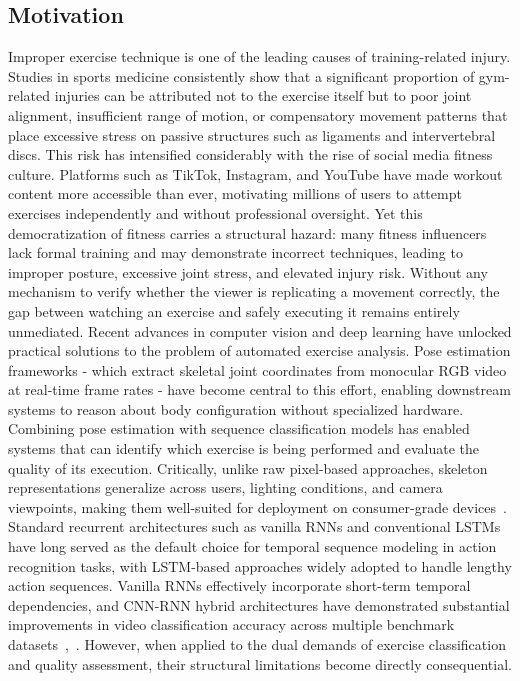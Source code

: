 \documentclass[conference,onecolumn,oneside]{IEEEtran}
\begin{document}
\subsection{Motivation}
\vspace{0.5cm}
Improper exercise technique is one of the leading causes of training-related injury. Studies in sports medicine consistently show that a significant proportion of gym-related injuries can be attributed not to the exercise itself but to poor joint alignment, insufficient range of motion, or compensatory movement patterns that place excessive stress on passive structures such as ligaments and intervertebral discs. This risk has intensified considerably with the rise of social media fitness culture. Platforms such as TikTok, Instagram, and YouTube have made workout content more accessible than ever, motivating millions of users to attempt exercises independently and without professional oversight. Yet this democratization of fitness carries a structural hazard: many fitness influencers lack formal training and may demonstrate incorrect techniques, leading to improper posture, excessive joint stress, and elevated injury risk. Without any mechanism to verify whether the viewer is replicating a movement correctly, the gap between watching an exercise and safely executing it remains entirely unmediated.
Recent advances in computer vision and deep learning have unlocked practical solutions to the problem of automated exercise analysis. Pose estimation frameworks - which extract skeletal joint coordinates from monocular RGB video at real-time frame rates - have become central to this effort, enabling downstream systems to reason about body configuration without specialized hardware. Combining pose estimation with sequence classification models has enabled systems that can identify which exercise is being performed and evaluate the quality of its execution. Critically, unlike raw pixel-based approaches, skeleton representations generalize across users, lighting conditions, and camera viewpoints, making them well-suited for deployment on consumer-grade devices~\cite{1}.
Standard recurrent architectures such as vanilla RNNs and conventional LSTMs have long served as the default choice for temporal sequence modeling in action recognition tasks, with LSTM-based approaches widely adopted to handle lengthy action sequences. Vanilla RNNs effectively incorporate short-term temporal dependencies, and CNN-RNN hybrid architectures have demonstrated substantial improvements in video classification accuracy across multiple benchmark datasets~\cite{16},~\cite{3}. However, when applied to the dual demands of exercise classification and quality assessment, their structural limitations become directly consequential.
\end{document}
